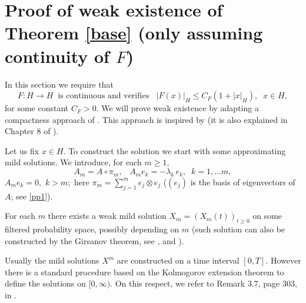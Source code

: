 \documentclass[preprint]{imsart}
\newtheorem{remark}[theorem]{Remark}
\begin{document}
 

\section{Proof of weak existence of Theorem \ref{base} (only assuming continuity of $F$)}
  
In this section we  require that   
\begin{equation} \label{qdd}
 F: H \to H \;\; \text{is continuous and verifies   } \;\; |F(x)|_H \le C_F (1 + |x|_H), \;\; x \in H,
\end{equation}  
   for some  constant $C_F >0$.
   We will prove weak existence  by adapting  a  compactness approach of  \cite{GG}. 
This approach   { is inspired by   \cite{DKP}}  (it is also explained  in  Chapter 8 of \cite{DZ}). 
 
 
 
 
Let us fix $x \in H$.  To construct the solution we start with some approximating mild solutions. We introduce, for each $m \ge 1$,  
$$
A_m = A \circ \pi_m ,\;\;\; A_m e_k =  - \lambda_k  \,  e_k,\;\; k = 1, \ldots m, 
$$
 $   A_m e_k =0, $ $k >m;$  here  
 $\pi_m=\sum_{j=1}^me_j\otimes e_j$ ($(e_j)$ is the basis of eigenvectors  of $A$; see \eqref{pp1}). 



  For each $m$  there exists a weak mild solution $X_m= (X_m(t))_{t \ge 0}$ on some filtered probability space, possibly depending on $m$  (such solution can also be constructed by the Girsanov theorem, see \cite{GG0}, \cite{DZ} and  \cite{DFPR}). 
  
Usually the mild solutions $X^m$ are constructed on a time interval $[0,T]$.  However there is a standard procedure based on the Kolmogorov extension theorem to define the solutions  on $[0, \infty)$. On this respect, we refer to  Remark 3.7, page 303, in \cite{KS}.  
\end{document}
